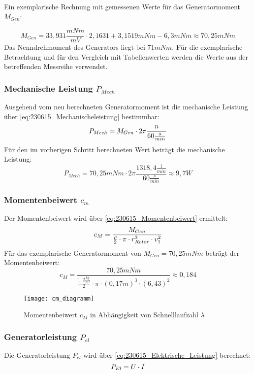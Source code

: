 Ein exemplarische Rechnung mit gemessenen Werte für das Generatormoment $M_{Gen}$:

$$M_{Gen} = 33,931\frac{mNm}{mV} \cdot 2,1631 + 3,1519 mNm - 6,3mNm \approx 70,25 mNm$$
Das Nenndrehmoment des Generators liegt bei $71 mNm$. Für die exemplarische Betrachtung und für den Vergleich mit Tabellenwerten werden die Werte aus der betreffenden Messreihe verwendet.
\subsubsection*{Mechanische Leistung $P_{Mech}$}
Ausgehend vom neu berechneten Generatormoment ist die mechanische Leistung über \autoref{eq:230615_Mechanischeleistung} bestimmbar:
\begin{equation}
    \centering
    P_{Mech} = M_{Gen} \cdot 2 \pi \frac{n}{60\frac{s}{min}}
    \label{eq:230615_Mechanischeleistung}
\end{equation}
Für den im vorherigen Schritt berechneten Wert beträgt die mechanische Leistung: 
$$P_{Mech} = 70,25mNm \cdot 2 \pi \frac{1318,4 \frac{1}{min}}{60\frac{s}{min}} \approx 9,7W$$

\subsubsection*{Momentenbeiwert $c_m$}
Der Momentenbeiwert wird über \autoref{eq:230615_Momentenbeiwert} ermittelt:
\begin{equation}
    \centering
    c_M = \frac{M_{Gen}}{ \frac{\rho}{2} \cdot \pi \cdot r_{Rotor}^3 \cdot v_1^2}
    \label{eq:230615_Momentenbeiwert}
\end{equation}
Für das exemplarische Generatormoment von $M_{Gen} = 70,25mNm$ beträgt der Momentenbeiwert:
$$c_M = \frac{70,25mNm}{ \frac{1,2 \frac{kg}{m^3}}{2} \cdot \pi \cdot (0,17 m)^3 \cdot (6,43)^2}\approx 0,184$$

\begin{figure}[H]
    \centering
    \texttt{[image: cm\_diagramm]}
    \caption{Momentenbeiwert $c_M$ in Abhängigkeit von Schnelllaufzahl $\lambda$}
    \label{fig:Momentenbeiwert}
\end{figure}

\subsubsection*{Generatorleistung $P_{el}$}
Die Generatorleistung $P_{el}$ wird über \autoref{eq:230615_Elektrische_Leistung} berechnet:
\begin{equation}
    \centering
    P_{El} = U \cdot I
    \label{eq:230615_Elektrische_Leistung}
\end{equation}

